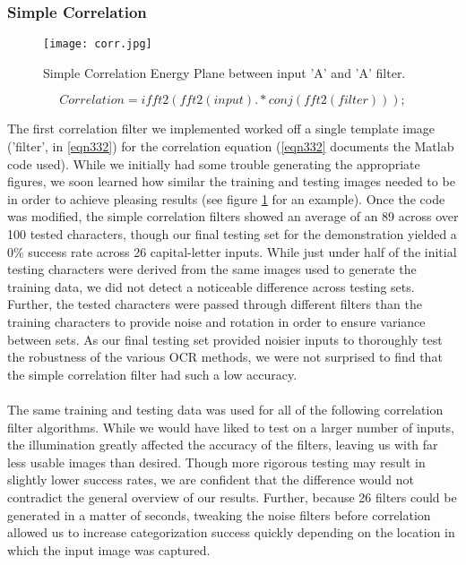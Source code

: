 \subsubsection{Simple Correlation}

\begin{figure}[h]
		\texttt{[image: corr.jpg]}\\
		\caption{Simple Correlation Energy Plane between input 'A' and 'A' filter.}
		\label{fig:corr}
\end{figure}


\begin{equation}
\label{eqn332}
Correlation = ifft2(fft2(input).*conj(fft2(filter)));
\end{equation}

The first correlation filter we implemented worked off a 
single template image ('filter', in \eqref{eqn332})
for the correlation equation (\eqref{eqn332} documents the Matlab 
code used). While we initially had some trouble generating the 
appropriate figures, we soon learned how similar the training 
and testing images needed to be in order to achieve pleasing results 
(see figure \ref{fig:corr} for an example). Once the code was modified, 
the simple correlation filters showed an average of an 89%
across over 100 tested characters, though our final testing set for the
demonstration yielded a 0\% success rate across 26 
capital-letter inputs. While just under half of the initial testing 
characters were derived from the same images used to generate the training 
data, we did not detect a noticeable difference across testing sets. Further, 
the tested characters were passed through different filters than the training 
characters to provide noise and rotation in order to ensure variance between 
sets. As our final testing set provided noisier inputs to thoroughly test the 
robustness of the various OCR methods, we were not surprised to find that the 
simple correlation filter had such a low accuracy.\\
\\
The same training and testing data was used for all of the following 
correlation filter algorithms. While we would have liked to test on a 
larger number of inputs, the illumination greatly affected the accuracy 
of the filters, leaving us with far less usable images than desired. 
Though more rigorous testing may result in slightly lower success rates, 
we are confident that the difference would not contradict the general 
overview of our results. Further, because 26 filters could be generated 
in a matter of seconds, tweaking the noise filters before correlation 
allowed us to increase categorization success quickly depending on the 
location in which the input image was captured.

